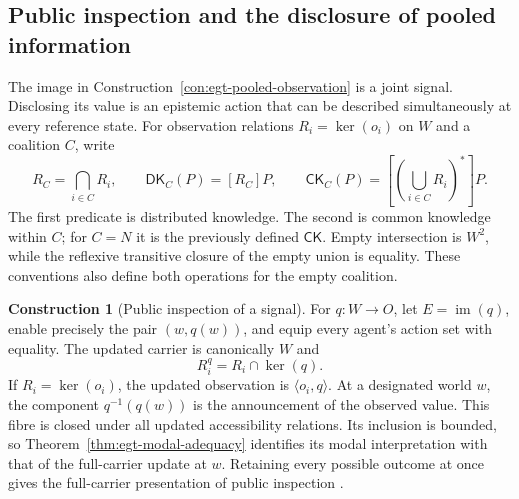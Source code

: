 \documentclass[11pt,a4paper]{article}
\numberwithin{equation}{section}
\theoremstyle{definition}
\newtheorem{construction}[construction]{Construction}
\theoremstyle{remark}
\theoremstyle{plain}
\begin{document}
\subsection{Public inspection and the disclosure of pooled information}
\label{sec:egt-public-inspection}

The image in Construction~\ref{con:egt-pooled-observation} is a joint
signal. Disclosing its value is an epistemic action that can be described
simultaneously at every reference state. For observation relations
$R_i=\ker(o_i)$ on $W$ and a coalition $C$, write
\[
 R_C=\bigcap_{i\in C}R_i,\qquad
 \mathsf{DK}_C(P)=[R_C]P,\qquad
 \mathsf{CK}_C(P)=\left[\left(\bigcup_{i\in C}R_i\right)^*\right]P.
\]
The first predicate is distributed knowledge. The second is common
knowledge within $C$; for $C=N$ it is the previously defined
$\mathsf{CK}$. Empty intersection is $W^2$, while the reflexive
transitive closure of the empty union is equality. These conventions
also define both operations for the empty coalition.

\begin{construction}[Public inspection of a signal]
\label{con:egt-public-inspection}
For $q:W\to O$, let $E=\operatorname{im}(q)$, enable precisely the pair
$(w,q(w))$, and equip every agent's action set with equality. The
updated carrier is canonically $W$ and
\[
 R_i^q=R_i\cap\ker(q).
\]
If $R_i=\ker(o_i)$, the updated observation is
$\langle o_i,q\rangle$. At a designated world $w$, the component
$q^{-1}(q(w))$ is the announcement of the observed value. This fibre is closed under all
updated accessibility relations. Its inclusion is bounded, so
Theorem~\ref{thm:egt-modal-adequacy} identifies its modal interpretation
with that of the full-carrier update at $w$.
Retaining every possible outcome at once gives the full-carrier
presentation of public inspection
\citep{VanEijckGattingerWang2017KnowingValues}.
\end{construction}
\end{document}
